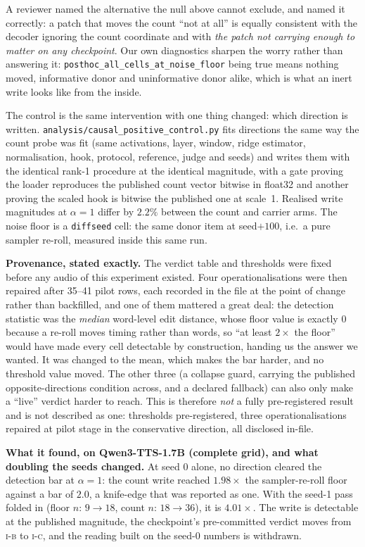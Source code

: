 \documentclass[11pt]{article}
\begin{document}
A reviewer named the alternative the null above cannot exclude, and named it
correctly: a patch that moves the count ``not at all'' is equally consistent
with the decoder ignoring the count coordinate and with \emph{the patch not
carrying enough to matter on any checkpoint}. Our own diagnostics sharpen the
worry rather than answering it: \texttt{posthoc\_all\_cells\_at\_noise\_floor}
being true means nothing moved, informative donor and uninformative donor alike,
which is what an inert write looks like from the inside.

The control is the same intervention with one thing changed: which direction is
written. \texttt{analysis/causal\_positive\_control.py} fits directions the same
way the count probe was fit (same activations, layer, window, ridge
estimator, normalisation, hook, protocol, reference, judge and seeds) and
writes them with the identical rank-1 procedure at the identical magnitude, with
a gate proving the loader reproduces the published count vector bitwise in
float32 and another proving the scaled hook is bitwise the published one at
scale~1. Realised write magnitudes at $\alpha{=}1$ differ by $2.2\%$ between the
count and carrier arms. The noise floor is a \texttt{diffseed} cell: the same
donor item at seed${+}100$, i.e.\ a pure sampler re-roll, measured inside this
same run.

\textbf{Provenance, stated exactly.} The verdict table and thresholds were fixed
before any audio of this experiment existed. Four operationalisations were then
repaired after 35--41 pilot rows, each recorded in the file at the point of
change rather than backfilled, and one of them mattered a great deal: the
detection statistic was the \emph{median} word-level edit distance, whose floor
value is exactly $0$ because a re-roll moves timing rather than words, so
``at least $2\times$ the floor'' would have made every cell detectable by
construction, handing us the answer we wanted. It was changed to the mean, which
makes the bar harder, and no threshold value moved. The other three (a collapse
guard, carrying the published opposite-directions condition across, and a
declared fallback) can also only make a ``live'' verdict harder to reach. This
is therefore \emph{not} a fully pre-registered result and is not described as
one: thresholds pre-registered, three operationalisations repaired at pilot stage
in the conservative direction, all disclosed in-file.

\textbf{What it found, on Qwen3-TTS-1.7B (complete grid), and what doubling the
seeds changed.} At seed 0 alone, no direction cleared the detection bar at
$\alpha{=}1$: the count write reached $1.98\times$ the sampler-re-roll floor
against a bar of $2.0$, a knife-edge that was reported as one. With the seed-1
pass folded in (floor $n{:}\,9\to18$, count $n{:}\,18\to36$), it is
$4.01\times$. The write is detectable at the published magnitude, the
checkpoint's pre-committed verdict moves from \textsc{i-b} to \textsc{i-c}, and
the reading built on the seed-0 numbers is withdrawn.
\end{document}

